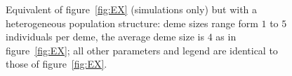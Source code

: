 \documentclass[11pt, letterpaper]{article}
\begin{document}
\begin{figure}
\caption{Equivalent of figure~\ref{fig:EX} (simulations only) but with a heterogeneous population structure: deme sizes range form $1$ to $5$ individuals per deme, the average deme size is $4$ as in figure~\ref{fig:EX};  all other parameters and legend are identical to those of figure~\ref{fig:EX}. }
\label{fig:EXhtg}
\end{figure}


 
\end{document}
